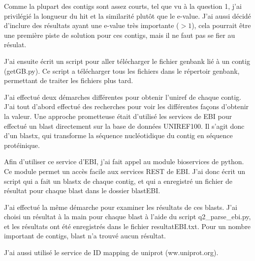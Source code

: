 \documentclass[10.9pt]{article} %
\begin{document}
Comme la plupart des contigs sont assez courts, tel que vu à la question 1, j'ai privilégié la longueur du hit
et la similarité plutôt que le e-value. J'ai aussi décidé d'inclure des résultats ayant une e-value très importante
($>1$), cela pourrait être une première piste de solution pour ces contigs, mais il ne faut pas se fier au résulat.

J'ai ensuite écrit un script pour aller télécharger le fichier genbank lié à un contig (getGB.py). Ce script
a télécharger tous les fichiers dans le répertoir genbank, permettant de traiter les fichiers plus tard.

J'ai effectué deux démarches différentes pour obtenir l'uniref de chaque contig. J'ai tout d'abord effectué
des recherches pour voir les différentes façons d'obtenir la valeur. Une approche prometteuse était d'utilisé
les services de EBI pour effectué un blast directement sur la base de données UNIREF100. Il s'agit donc d'un
blastx, qui transforme la séquence nucléotidique du contig en séquence protéinique. 

Afin d'utiliser ce service d'EBI, j'ai fait appel au module bioservices de python. Ce module permet un accès facile
aux services REST de EBI. J'ai donc écrit un script qui a fait un blastx de chaque contig, et qui a enregistré un
fichier de résultat pour chaque blast dans le dossier blastEBI.

J'ai effectué la même démarche pour examiner les résultats de ces blasts. J'ai choisi un résultat à la main pour
chaque blast à l'aide du script q2\_parse\_ebi.py, et les résultats ont été enregistrés dans le fichier resultatEBI.txt.
Pour un nombre important de contigs, blast n'a trouvé aucun résultat.

J'ai aussi utilisé le service de ID mapping de uniprot (ww.uniprot.org).
\end{document}
